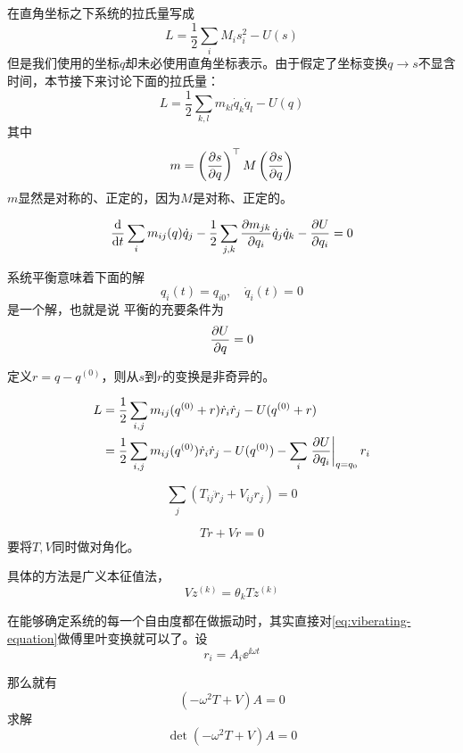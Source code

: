 在直角坐标之下系统的拉氏量写成
\[
    L = \frac{1}{2} \sum_i M_i s_i^2 - U(s)
\]
但是我们使用的坐标$q$却未必使用直角坐标表示。由于假定了坐标变换$q\longrightarrow s$不显含时间，本节接下来讨论下面的拉氏量：
\begin{equation}
    L = \frac{1}{2} \sum_{k,l} m_{kl} \dot{q}_k \dot{q}_l - U(q) 
\end{equation}
其中
\begin{equation}
    m = \left(\pdv{s}{q}\right)^\top M \left(\pdv{s}{q}\right)  
\end{equation}
$m$显然是对称的、正定的，因为$M$是对称、正定的。

\[
    \dv{t} \sum_{i} m_{ij}(q) \dot{q}_j - \frac{1}{2} \sum_{j, k} \pdv{m_{jk}}{q_i} \dot{q}_j \dot{q}_k - \pdv{U}{q_i} = 0
\]

系统平衡意味着下面的解
\[
    q_i(t) = q_{i0}, \quad \dot{q}_i(t) = 0
\]
是一个解，也就是说
平衡的充要条件为
\begin{equation}
    \pdv{U}{q} = 0
\end{equation}

定义$r = q - q^{(0)}$，则从$s$到$r$的变换是非奇异的。

\[
    \begin{aligned}
        L &= \frac{1}{2} \sum_{i,j} m_{ij} (q^{(0)}+r) \dot{r}_i \dot{r}_j - U(q^{(0)}+r) \\
        &= \frac{1}{2} \sum_{i,j} m_{ij}(q^{(0)}) \dot{r}_i \dot{r}_j - U(q^{(0)}) - \sum_{i} \eval{\pdv{U}{q_i}}_{q=q_0} r_i 
    \end{aligned}
\]

\begin{equation}
    \sum_{j} (T_{ij} \ddot{r}_j + V_{ij} r_j) = 0
    \label{eq:viberating-equation}
\end{equation}

\[
    T \ddot{r} + V r = 0
\]
要将$T,V$同时做对角化。

具体的方法是广义本征值法，
\begin{equation}
    V z^{(k)} = \theta_k T z^{(k)}
\end{equation}

在能够确定系统的每一个自由度都在做振动时，其实直接对\eqref{eq:viberating-equation}做傅里叶变换就可以了。设
\begin{equation}
    r_i = A_i \ee^{\ii \omega t}
\end{equation}

那么就有
\begin{equation}
    (-\omega^2 T + V) A = 0
    \label{eq:amplitude}
\end{equation}
求解
\begin{equation}
    \det (-\omega^2 T + V) A = 0
\end{equation}

